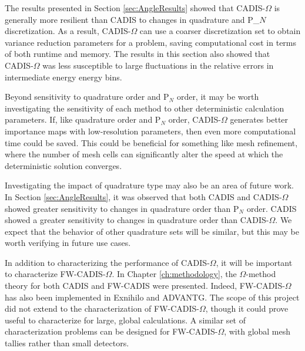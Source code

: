 The results presented in Section \ref{sec:AngleResults} showed that
CADIS-$\Omega$ is generally more resilient than CADIS to changes in
quadrature and P_$N$ discretization. As a result, CADIS-$\Omega$ can use a coarser
discretization set to obtain variance reduction parameters for a problem, saving
computational cost in terms of both runtime and memory. The results in this section also showed that CADIS-$\Omega$ was less
susceptible to large fluctuations in the relative errors in intermediate energy
energy bins.

Beyond sensitivity to quadrature order and P$_N$ order, it may be worth
investigating the sensitivity of each method to other deterministic calculation
parameters. If, like quadrature order and P$_N$ order, CADIS-$\Omega$ generates
better importance maps with low-resolution parameters, then even more
computational time could be saved. This could be beneficial for something like
mesh refinement, where the number of mesh cells can significantly alter the
speed at which the deterministic solution converges.

Investigating the impact of quadrature type may also be an area of future work.
In Section \ref{sec:AngleResults}, it was observed that both CADIS and
CADIS-$\Omega$ showed greater sensitivity to changes in quadrature order than
P$_N$ order. CADIS showed a greater sensitivity to changes in quadrature order
than CADIS-$\Omega$. We expect that the behavior of other quadrature sets will
be similar, but this may be worth verifying in future use cases.

In addition to characterizing the performance of CADIS-$\Omega$, it will be
important to characterize FW-CADIS-$\Omega$. In Chapter \ref{ch:methodology},
the $\Omega$-method theory for both CADIS and FW-CADIS were presented. Indeed,
FW-CADIS-$\Omega$ has also been implemented in Exnihilo and ADVANTG. The scope
of this project did not extend to the characterization of FW-CADIS-$\Omega$, though
it could prove useful to characterize for large, global calculations. A similar
set of characterization problems can be designed for FW-CADIS-$\Omega$, with
global mesh tallies rather than small detectors.

